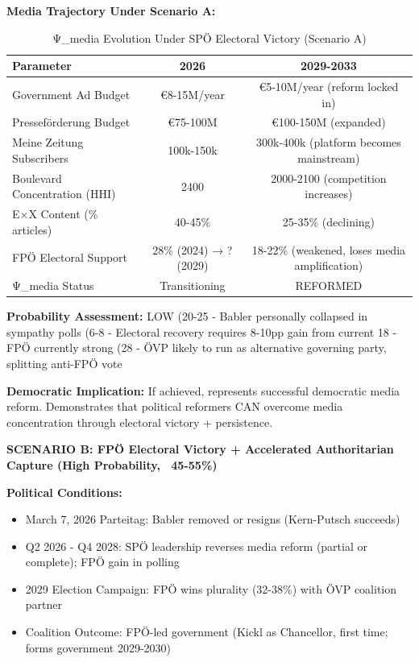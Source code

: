 \textbf{Media Trajectory Under Scenario A:}

\begin{table}[h]
\centering
\caption{Ψ_media Evolution Under SPÖ Electoral Victory (Scenario A)}
\label{tab:dx-scenario-a}
\begin{tabular}{|l|c|c|}
\hline
\textbf{Parameter} & \textbf{2026} & \textbf{2029-2033} \\
\hline
Government Ad Budget & €8-15M/year & €5-10M/year (reform locked in) \\
\hline
Presseförderung Budget & €75-100M & €100-150M (expanded) \\
\hline
Meine Zeitung Subscribers & 100k-150k & 300k-400k (platform becomes mainstream) \\
\hline
Boulevard Concentration (HHI) & 2400 & 2000-2100 (competition increases) \\
\hline
E×X Content (\% articles) & 40-45\% & 25-35\% (declining) \\
\hline
FPÖ Electoral Support & 28\% (2024) → ? (2029) & 18-22\% (weakened, loses media amplification) \\
\hline
Ψ_media Status & Transitioning & REFORMED \\
\hline
\end{tabular}
\end{table}

\textbf{Probability Assessment:} LOW (20-25%
- Babler personally collapsed in sympathy polls (6-8%
- Electoral recovery requires 8-10pp gain from current 18%
- FPÖ currently strong (28%
- ÖVP likely to run as alternative governing party, splitting anti-FPÖ vote

\textbf{Democratic Implication:} If achieved, represents successful democratic media reform.
Demonstrates that political reformers CAN overcome media concentration through electoral victory + persistence.

\vspace{0.5cm}

\textbf{SCENARIO B: FPÖ Electoral Victory + Accelerated Authoritarian Capture (High Probability, ~45-55\%)}

\textbf{Political Conditions:}
\begin{itemize}
\item March 7, 2026 Parteitag: Babler removed or resigns (Kern-Putsch succeeds)
\item Q2 2026 - Q4 2028: SPÖ leadership reverses media reform (partial or complete); FPÖ gain in polling
\item 2029 Election Campaign: FPÖ wins plurality (32-38\%) with ÖVP coalition partner
\item Coalition Outcome: FPÖ-led government (Kickl as Chancellor, first time; forms government 2029-2030)
\end{itemize}

